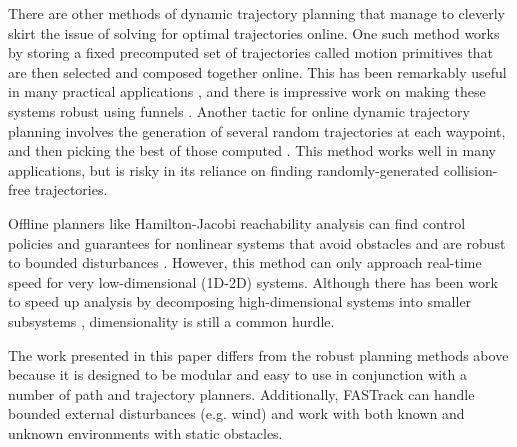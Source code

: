 
There are other methods of dynamic trajectory planning that manage to cleverly skirt the issue of solving for optimal trajectories online.  One such method works by storing a fixed precomputed set of trajectories called motion primitives that are then selected and composed together online.  This has been remarkably useful in many practical applications \cite{Gillula2010, Dey2016, Barry2016}, and there is impressive work on making these systems robust using funnels \cite{Majumdar2016}.  Another tactic for online dynamic trajectory planning involves the generation of several random trajectories at each waypoint, and then picking the best of those computed \cite{Kalakrishnan2011, Schwesinger2013, Krusi2015}.  This method works well in many applications, but is risky in its reliance on finding randomly-generated collision-free trajectories.  

Offline planners like Hamilton-Jacobi reachability analysis can find control policies and guarantees for nonlinear systems that avoid obstacles and are robust to bounded disturbances \cite{Mitchell05}.  However, this method can only approach real-time speed for very low-dimensional (1D-2D) systems. Although there has been work to speed up analysis by decomposing high-dimensional systems into smaller subsystems \cite{Chen2016a, Chen2016b}, dimensionality is still a common hurdle.

The work presented in this paper differs from the robust planning methods above because it is designed to be modular and easy to use in conjunction with a number of path and trajectory planners. Additionally, FASTrack can handle bounded external disturbances (e.g. wind) and work with both known and unknown environments with static obstacles. 